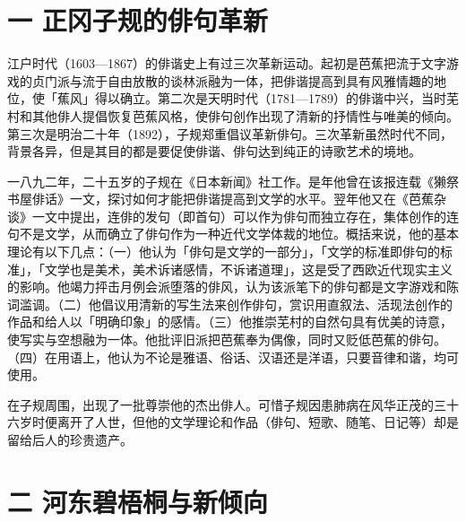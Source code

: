 \section*{\FS 一 正冈子规的俳句革新}

 {\FS
  江户时代（1603—1867）的俳谐史上有过三次革新运动。起初是芭蕉把流于文字游戏的贞门派与流于自由放散的谈林派融为一体，把俳谐提高到具有风雅情趣的地位，使「蕉风」得以确立。第二次是天明时代（1781—1789）的俳谐中兴，当时芜村和其他俳人提倡恢复芭蕉风格，使俳句创作出现了清新的抒情性与唯美的倾向。第三次是明治二十年（1892），子规郑重倡议革新俳句。三次革新虽然时代不同，背景各异，但是其目的都是要促使俳谐、俳句达到纯正的诗歌艺术的境地。

  一八九二年，二十五岁的子规在《日本新闻》社工作。是年他曾在该报连载《獭祭书屋俳话》一文，探讨如何才能把俳谐提高到文学的水平。翌年他又在《芭蕉杂谈》一文中提出，连俳的发句（即首句）可以作为俳句而独立存在，集体创作的连句不是文学，从而确立了俳句作为一种近代文学体裁的地位。概括来说，他的基本理论有以下几点：（一）他认为「俳句是文学的一部分」，「文学的标准即俳句的标准」，「文学也是美术，美术诉诸感情，不诉诸道理」，这是受了西欧近代现实主义的影响。他竭力抨击月例会派堕落的俳风，认为该派笔下的俳句都是文字游戏和陈词滥调。（二）他倡议用清新的写生法来创作俳句，赏识用直叙法、活现法创作的作品和给人以「明确印象」的感情。（三）他推崇芜村的自然句具有优美的诗意，使写实与空想融为一体。他批评旧派把芭蕉奉为偶像，同时又贬低芭蕉的俳句。（四）在用语上，他认为不论是雅语、俗话、汉语还是洋语，只要音律和谐，均可使用。

  在子规周围，出现了一批尊崇他的杰出俳人。可惜子规因患肺病在风华正茂的三十六岁时便离开了人世，但他的文学理论和作品（俳句、短歌、随笔、日记等）却是留给后人的珍贵遗产。
 }

\section*{\FS 二 河东碧梧桐与新倾向}

